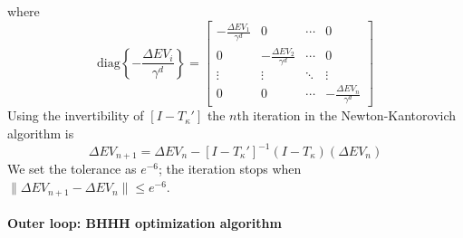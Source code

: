 \documentclass[11pt]{article}
\begin{document}
where 
\[
\text{diag}\left\{ -\frac{\Delta EV_{i}}{\gamma^{d}}\right\} =\left[\begin{array}{cccc}
-\frac{\Delta EV_{1}}{\gamma^{d}} & 0 & \cdots & 0\\
0 & -\frac{\Delta EV_{2}}{\gamma^{d}} & \cdots & 0\\
\vdots & \vdots & \ddots & \vdots\\
0 & 0 & \cdots & -\frac{\Delta EV_{n}}{\gamma^{d}}
\end{array}\right]
\]
Using the invertibility of $\left[I-T_{\kappa}'\right]$ the $n$th
iteration in the Newton-Kantorovich algorithm is 
\[
\Delta EV_{n+1}=\Delta EV_{n}-\left[I-T_{\kappa}'\right]^{-1}\left(I-T_{\kappa}\right)\left(\Delta EV_{n}\right)
\]
We set the tolerance as $e^{-6}$; the iteration stops when $\|\Delta EV_{n+1}-\Delta EV_{n}\|\leq e^{-6}$. 

\paragraph{Outer loop: BHHH optimization algorithm}
\end{document}
